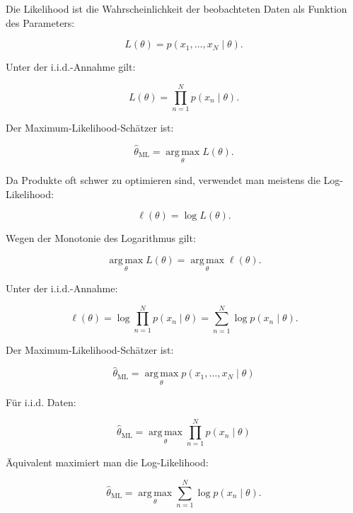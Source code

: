 \documentclass[11pt,a4paper]{scrartcl}
\begin{document}
\begin{calculationbox}
    Die Likelihood ist die Wahrscheinlichkeit der beobachteten Daten als
    Funktion des Parameters:

    \[
        L(\theta)
        =
        p(x_1,\dots,x_N \mid \theta).
    \]

    Unter der i.i.d.-Annahme gilt:

    \[
        L(\theta)
        =
        \prod_{n=1}^{N}
        p(x_n \mid \theta).
    \]

    Der Maximum-Likelihood-Schätzer ist:

    \[
        \hat\theta_{\mathrm{ML}}
        =
        \operatorname*{arg\,max}_{\theta}
        L(\theta).
    \]
\end{calculationbox}

\begin{calculationbox}
    Da Produkte oft schwer zu optimieren sind, verwendet man meistens die
    Log-Likelihood:

    \[
        \ell(\theta)
        =
        \log L(\theta).
    \]

    Wegen der Monotonie des Logarithmus gilt:

    \[
        \operatorname*{arg\,max}_{\theta} L(\theta)
        =
        \operatorname*{arg\,max}_{\theta} \ell(\theta).
    \]

    Unter der i.i.d.-Annahme:

    \[
        \ell(\theta)
        =
        \log
        \prod_{n=1}^{N}
        p(x_n \mid \theta)
        =
        \sum_{n=1}^{N}
        \log p(x_n \mid \theta).
    \]
\end{calculationbox}

\begin{answerbox}
    Der Maximum-Likelihood-Schätzer ist:

    \[
        \boxed{
            \hat\theta_{\mathrm{ML}}
            =
            \operatorname*{arg\,max}_{\theta}
            p(x_1,\dots,x_N \mid \theta)
        }
    \]

    Für i.i.d. Daten:

    \[
        \boxed{
            \hat\theta_{\mathrm{ML}}
            =
            \operatorname*{arg\,max}_{\theta}
            \prod_{n=1}^{N}
            p(x_n \mid \theta)
        }
    \]

    Äquivalent maximiert man die Log-Likelihood:

    \[
        \boxed{
            \hat\theta_{\mathrm{ML}}
            =
            \operatorname*{arg\,max}_{\theta}
            \sum_{n=1}^{N}
            \log p(x_n \mid \theta).
        }
    \]
\end{answerbox}
\end{document}
